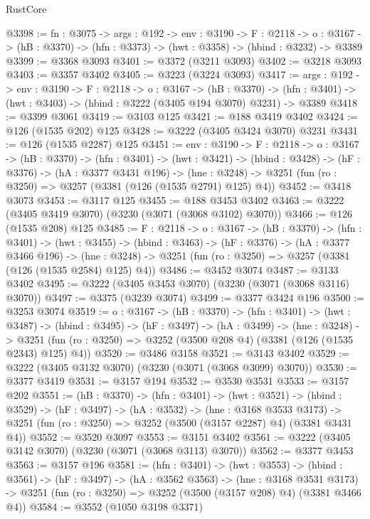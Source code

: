 \begin{lexlean}{RustCore}
\begin{coremodule}
@3398 := {fn : @3075} ->
  {args : @192} ->
  {env : @3190} ->
  {F : @2118} ->
  {o : @3167} -> (hB : @3370) -> (hfn : @3373) -> (hwt : @3358) -> (hbind : @3232) -> @3389
@3399 := @3368 @3093
@3401 := @3372 (@3211 @3093)
@3402 := @3218 @3093
@3403 := @3357 @3402
@3405 := @3223 (@3224 @3093)
@3417 := {args : @192} ->
  {env : @3190} ->
  {F : @2118} ->
  {o : @3167} ->
  (hB : @3370) ->
  (hfn : @3401) -> (hwt : @3403) -> (hbind : @3222 (@3405 @194 @3070) @3231) -> @3389
@3418 := @3399 @3061
@3419 := @3103 @125
@3421 := @188 @3419 @3402
@3424 := @126 (@1535 @202) @125
@3428 := @3222 (@3405 @3424 @3070) @3231
@3431 := @126 (@1535 @2287) @125
@3451 := {env : @3190} ->
  {F : @2118} ->
  {o : @3167} ->
  (hB : @3370) ->
  (hfn : @3401) ->
  (hwt : @3421) ->
  (hbind : @3428) ->
  (hF : @3376) ->
  (hA : @3377 @3431 @196) ->
  (hne : @3248) -> @3251 (fun (ro : @3250) => @3257 (@3381 (@126 (@1535 @2791) @125) @4))
@3452 := @3418 @3073
@3453 := @3117 @125
@3455 := @188 @3453 @3402
@3463 := @3222 (@3405 @3419 @3070) (@3230 (@3071 (@3068 @3102) @3070))
@3466 := @126 (@1535 @208) @125
@3485 := {F : @2118} ->
  {o : @3167} ->
  (hB : @3370) ->
  (hfn : @3401) ->
  (hwt : @3455) ->
  (hbind : @3463) ->
  (hF : @3376) ->
  (hA : @3377 @3466 @196) ->
  (hne : @3248) -> @3251 (fun (ro : @3250) => @3257 (@3381 (@126 (@1535 @2584) @125) @4))
@3486 := @3452 @3074
@3487 := @3133 @3402
@3495 := @3222 (@3405 @3453 @3070) (@3230 (@3071 (@3068 @3116) @3070))
@3497 := @3375 (@3239 @3074)
@3499 := @3377 @3424 @196
@3500 := @3253 @3074
@3519 := {o : @3167} ->
  (hB : @3370) ->
  (hfn : @3401) ->
  (hwt : @3487) ->
  (hbind : @3495) ->
  (hF : @3497) ->
  (hA : @3499) ->
  (hne : @3248) ->
  @3251 (fun (ro : @3250) => @3252 (@3500 @208 @4) (@3381 (@126 (@1535 @2343) @125) @4))
@3520 := @3486 @3158
@3521 := @3143 @3402
@3529 := @3222 (@3405 @3132 @3070) (@3230 (@3071 (@3068 @3099) @3070))
@3530 := @3377 @3419
@3531 := @3157 @194
@3532 := @3530 @3531
@3533 := @3157 @202
@3551 := (hB : @3370) ->
  (hfn : @3401) ->
  (hwt : @3521) ->
  (hbind : @3529) ->
  (hF : @3497) ->
  (hA : @3532) ->
  (hne : @3168 @3533 @3173) ->
  @3251 (fun (ro : @3250) => @3252 (@3500 (@3157 @2287) @4) (@3381 @3431 @4))
@3552 := @3520 @3097
@3553 := @3151 @3402
@3561 := @3222 (@3405 @3142 @3070) (@3230 (@3071 (@3068 @3113) @3070))
@3562 := @3377 @3453
@3563 := @3157 @196
@3581 := (hfn : @3401) ->
  (hwt : @3553) ->
  (hbind : @3561) ->
  (hF : @3497) ->
  (hA : @3562 @3563) ->
  (hne : @3168 @3531 @3173) ->
  @3251 (fun (ro : @3250) => @3252 (@3500 (@3157 @208) @4) (@3381 @3466 @4))
@3584 := @3552 (@1050 @3198 @3371)

\end{coremodule}
\end{lexlean}
